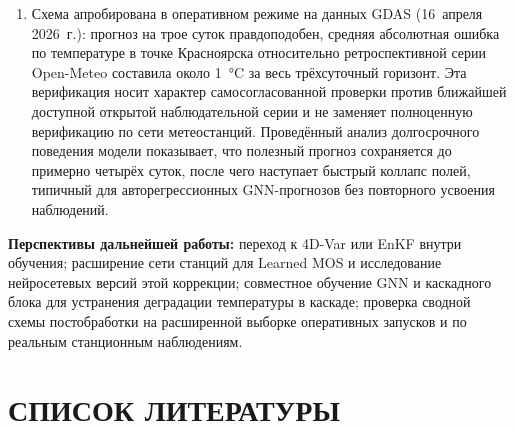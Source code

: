 \documentclass[14pt,a4paper]{extarticle}
\numberwithin{table}{section}
\numberwithin{figure}{section}
\numberwithin{equation}{section}
\begin{document}
\begin{enumerate}
  все узлы региона. Для скорости ветра дополнительно применяется
  сезонная мультипликативная поправка по станционным данным. Данный
  постобработка применяется только при выдаче прогноза в точках
  станций; на сетке реанализа он использоваться не должен.
\item
  Схема апробирована в оперативном режиме на данных GDAS
  (16~апреля 2026~г.): прогноз на трое суток правдоподобен, средняя
  абсолютная ошибка по температуре в точке Красноярска относительно
  ретроспективной серии Open-Meteo составила около 1~°C за весь
  трёхсуточный горизонт. Эта верификация носит характер
  самосогласованной проверки против ближайшей доступной открытой
  наблюдательной серии и не заменяет полноценную верификацию по сети
  метеостанций. Проведённый анализ долгосрочного
  поведения модели показывает, что полезный прогноз сохраняется
  до примерно четырёх суток, после чего наступает быстрый коллапс
  полей, типичный для авторегрессионных GNN-прогнозов без повторного
  усвоения наблюдений.
\end{enumerate}

\textbf{Перспективы дальнейшей работы:} переход к 4D-Var или EnKF
внутри обучения; расширение сети станций для Learned MOS
и исследование нейросетевых версий этой коррекции; совместное
обучение GNN и каскадного блока для устранения деградации температуры
в каскаде; проверка сводной схемы постобработки на расширенной выборке оперативных
запусков и по реальным станционным наблюдениям.


\newpage

\section*{СПИСОК ЛИТЕРАТУРЫ}
\end{document}

